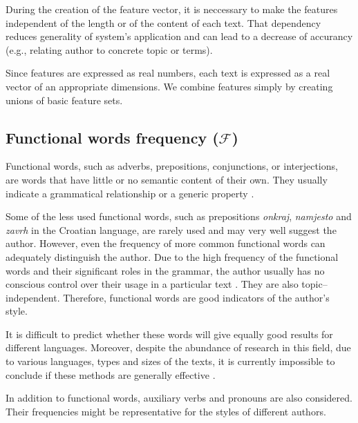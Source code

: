 \documentclass[11pt,english]{article}
\begin{document}
\begin{multicols}{2}
During the creation of the feature vector, it is neccessary to make the
features independent of the length or of the content of each text. That
dependency reduces generality of system's application and can lead to a decrease of accurancy
(e.g., relating author to concrete topic or terms).

Since features are expressed as real numbers, each text is expressed as a real
vector of an appropriate dimensions. We combine features simply by creating unions of basic feature sets.



\subsection{Functional words frequency ($\mathcal{F}$)}
\label{sec:funkcijske-rijeci}
Functional words, such as adverbs, prepositions, conjunctions, or interjections,
are words that have little or no semantic content of their
own. They usually indicate a grammatical relationship or a generic property
\citep{zhao2005effective}.

Some of the less used functional words, such as prepositions \emph{onkraj},
\emph{namjesto} and \emph{zavrh} in the Croatian language, are rarely used and may very well suggest the
author. However, even the frequency of more common functional words can adequately distinguish the author. 
Due to the high frequency of the functional words and their significant roles in the grammar, the author 
usually has no conscious control over their usage in a particular text
\citep{argamon2005measuring}. They are also topic--independent.
Therefore, functional words are good indicators of the author's style.

It is difficult to predict whether these words will give equally good
results for different languages. Moreover, despite the abundance of research in this
field, due to various languages, types and sizes of the texts, it is
currently impossible to conclude if these methods are generally effective \citep{zhao2005effective}.

In addition to functional words, auxiliary verbs and pronouns are also considered.
Their frequencies might be representative for the styles of different authors.


\end{multicols}
\end{document}
